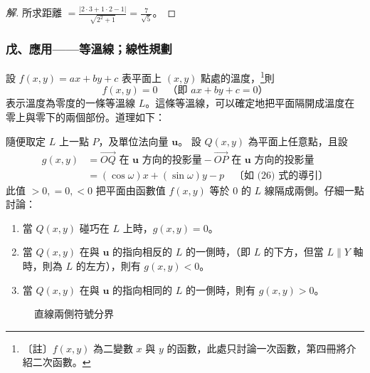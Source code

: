 \begin{proof}[解]
所求距離 $= \frac{|2\cdot 3 + 1\cdot 2 - 1|}{\sqrt{2^2 + 1}} = \frac{7}{\sqrt{5}}$。
\end{proof}

\subsubsection*{戊、應用——等溫線；線性規劃}

設 $f(x, y) = ax + by + c$ 表平面上 $(x, y)$ 點處的溫度，\footnote{〔註〕$f(x, y)$ 為二變數 $x$ 與 $y$ 的函數，此處只討論一次函數，第四冊將介紹二次函數。}則
\[ f(x, y) = 0 \quad\text{（即 $ax + by + c = 0$）} \]
表示溫度為零度的一條等溫線 $L$。這條等溫線，可以確定地把平面隔開成溫度在零上與零下的兩個部份。道理如下：

隨便取定 $L$ 上一點 $P$，及單位法向量 $\mathbf{u}$。
設 $Q(x, y)$ 為平面上任意點，且設
\begin{align*}
g(x, y) &= \vec{OQ} \text{ 在 } \mathbf{u} \text{ 方向的投影量} - \vec{OP} \text{ 在 } \mathbf{u} \text{ 方向的投影量} \\
&= (\cos\omega)x + (\sin\omega)y - p \quad\text{〔如 (26) 式的導引〕}
\end{align*}
此值 $> 0, = 0, < 0$ 把平面由函數值 $f(x, y)$ 等於 0 的 $L$ 線隔成兩側。仔細一點討論：
\begin{enumerate}[label=(\roman*), leftmargin=2em]
  \item 當 $Q(x, y)$ 碰巧在 $L$ 上時，$g(x, y) = 0$。
  \item 當 $Q(x, y)$ 在與 $\mathbf{u}$ 的指向相反的 $L$ 的一側時，（即 $L$ 的下方，但當 $L \parallel Y$ 軸時，則為 $L$ 的左方），則有 $g(x, y) < 0$。
  \item 當 $Q(x, y)$ 在與 $\mathbf{u}$ 的指向相同的 $L$ 的一側時，則有 $g(x, y) > 0$。
\end{enumerate}

\begin{figure}[H]
\centering
{}
\caption{直線兩側符號分界}
\label{fig:4-32}
\end{figure}


